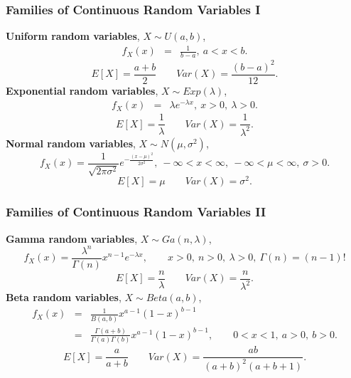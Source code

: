 \documentclass[serif,10pt,compress]{beamer}
\begin{document}
\begin{frame}[t]
\frametitle{Families of Continuous Random Variables I}

{\bf Uniform random variables}, $X \sim U(a,b)$,
\begin{eqnarray*}
f_X(x) &=& \frac{1}{b-a}, \ a < x < b.
\end{eqnarray*}
\[
E[X]=\frac{a+b}{2} \qquad Var(X) = \frac{(b-a)^2}{12}.
\]
{\bf Exponential random variables}, $X \sim Exp(\lambda)$, 
\begin{eqnarray*}
f_X(x)&=& \lambda e^{-\lambda x}, \ x>0, \ \lambda>0.
\end{eqnarray*}
\[
E[X]= \frac{1}{\lambda} \qquad Var(X) = \frac{1}{\lambda^2}.
\]
{\bf Normal random variables}, $X \sim N(\mu,\sigma^2)$, 
\[
f_X(x) = \frac{1}{\sqrt{2\pi \sigma^2}} e^{-\frac{(x-\mu)^2}{2\sigma^2}}, \ -\infty < x < \infty, \ -\infty < \mu < \infty, \ \sigma>0.
\]
\[
E[X]= \mu \qquad Var(X) = \sigma^2.
\]
\end{frame}

\begin{frame}[t]
\frametitle{Families of Continuous Random Variables II}
{\bf Gamma random variables}, $X \sim Ga(n,\lambda)$,
\[
f_X(x) = \frac{\lambda^{n}}{\Gamma(n)} x^{n-1}
e^{-\lambda x}, \qquad x>0, \ n>0,\ \lambda>0, \ \Gamma(n)=(n-1)!
\]
\[
E[X] = \frac{n}{\lambda} \qquad Var(X) = \frac{n}{\lambda^2}. 
\]
{\bf Beta random variables}, $X \sim Beta(a,b)$,
\begin{eqnarray*}
f_X(x) &=& \frac{1}{B(a,b)} x^{a-1}(1-x)^{b-1} \\
&=&  \frac{\Gamma(a+b)}{\Gamma(a)\Gamma(b)} x^{a-1}(1-x)^{b-1},\qquad 0<x<1, \ a>0, \ b >0. 
\end{eqnarray*}
\[
E[X]=\frac{a}{a+b} \qquad  Var(X) = \frac{ab}{(a+b)^2(a+b+1)}.
\]
\end{frame}
\end{document}
